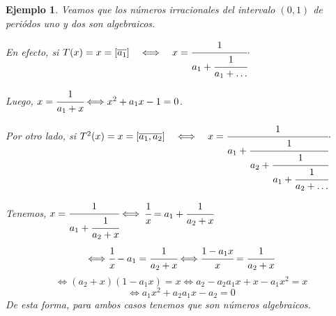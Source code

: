 \documentclass[12pt]{report}
\newtheorem{prop}{Proposición}[section]
\newtheorem{lemma}{Lema}[section]
\newtheorem{ejem}{Ejemplo}[section]
\begin{document}




\begin{ejem}
Veamos que los números irracionales del intervalo $(0,1)$ de periódos uno y dos son algebraicos.

En efecto, si $T(x)=x=[\overline{a_{1}}] \quad \Longleftrightarrow\quad x=\cfrac{1}{a_{1}+\cfrac{1}{a_{1}+\ldots}}\cdot$

Luego, $x=\cfrac{1}{a_{1}+x}\Longleftrightarrow x^{2}+a_{1}x-1=0$.


Por otro lado, si $T^{2}(x)=x=[\overline{a_{1},a_{2}}]\quad \Longleftrightarrow\quad x=\cfrac{1}{a_{1}+\cfrac{1}{a_{2}+\cfrac{1}{a_{1}+\cfrac{1}{a_{2}+\ldots}}}}\cdot$

Tenemos, $x=\cfrac{1}{a_{1}+\cfrac{1}{a_{2}+x}} \Longleftrightarrow $ $\cfrac{1}{x}=a_{1}+\cfrac{1}{a_{2}+x}$
$$
\Longleftrightarrow \cfrac{1}{x}-a_{1}=\cfrac{1}{a_{2}+x}\Longleftrightarrow \cfrac{1-a_{1}x}{x}=\cfrac{1}{a_{2}+x}
$$
$$
\Longleftrightarrow(a_{2}+x)(1-a_{1}x)=x\Longleftrightarrow a_{2}-a_{2}a_{1}x+x-a_{1}x^{2}=x
$$
$$
\Longleftrightarrow a_{1}x^{2}+a_{2}a_{1}x-a_{2}=0
$$
De esta forma, para ambos casos tenemos que son números algebraicos.
\end{ejem}
\end{document}
